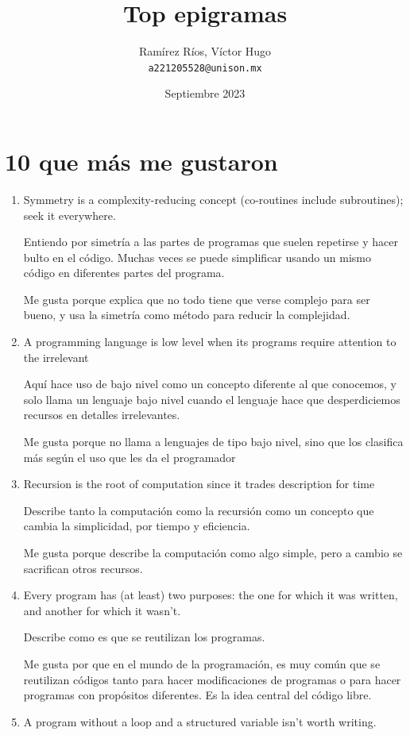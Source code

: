 \documentclass{article}
\title{Top epigramas}
\author{
  Ramírez Ríos, Víctor Hugo\\
  \texttt{a221205528@unison.mx}
}
\date{Septiembre 2023}
\begin{document}
\maketitle

\section{10 que más me gustaron}
\begin{enumerate}
    \item Symmetry is a complexity-reducing concept (co-routines include subroutines); seek it everywhere.
    \par Entiendo por simetría a las partes de programas que suelen repetirse y hacer bulto en el código. Muchas veces se puede simplificar usando un mismo código en diferentes partes del programa. 
    \par Me gusta porque explica que no todo tiene que verse complejo para ser bueno, y usa la simetría como método para reducir la complejidad.
    \item A programming language is low level when its programs require attention to the irrelevant
    \par Aquí hace uso de bajo nivel como un concepto diferente al que conocemos, y solo llama un lenguaje bajo nivel cuando el lenguaje hace que desperdiciemos recursos en detalles irrelevantes.
    \par Me gusta porque no llama a lenguajes de tipo bajo nivel, sino que los clasifica más según el uso que les da el programador
    \item Recursion is the root of computation since it trades description for time
    \par Describe tanto la computación como la recursión como un concepto que cambia la simplicidad, por tiempo y eficiencia. 
    \par Me gusta porque describe la computación como algo simple, pero a cambio se sacrifican otros recursos.
    \item Every program has (at least) two purposes: the one for which it was written, and another for which it wasn’t.
    \par Describe como es que se reutilizan los programas. 
    \par Me gusta por que en el mundo de la programación, es muy común que se reutilizan códigos tanto para hacer modificaciones de programas o para hacer programas con propósitos diferentes. Es la idea central del código libre.
    \item  A program without a loop and a structured variable isn’t worth writing.

\end{enumerate}
\end{document}
